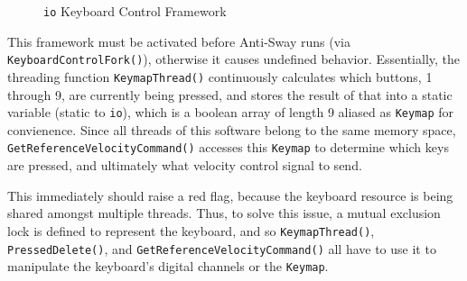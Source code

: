 \documentclass[letterpaper]{article}
\begin{document}
\begin{figure}[H]
    \centering
    \label{io-mdd2}
    \caption{\texttt{io} Keyboard Control Framework}
\end{figure}

This framework must be activated before Anti-Sway runs (via \texttt{KeyboardControlFork()}), otherwise it causes undefined behavior. Essentially, the threading function \texttt{KeymapThread()} continuously calculates which buttons, 1 through 9, are currently being pressed, and stores the result of that into a static variable (static to \texttt{io}), which is a boolean array of length 9 aliased as \texttt{Keymap} for convienence. Since all threads of this software belong to the same memory space, \texttt{GetReferenceVelocityCommand()} accesses this \texttt{Keymap} to determine which keys are pressed, and ultimately what velocity control signal to send.

This immediately should raise a red flag, because the keyboard resource is being shared amongst multiple threads. Thus, to solve this issue, a mutual exclusion lock is defined to represent the keyboard, and so \texttt{KeymapThread()}, \texttt{PressedDelete()}, and \texttt{GetReferenceVelocityCommand()} all have to use it to manipulate the keyboard's digital channels or the \texttt{Keymap}.
\end{document}
